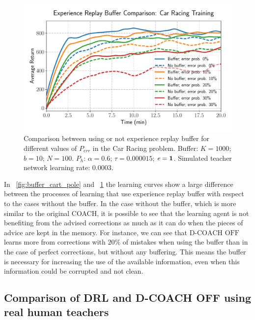 \begin{figure}[H]
    \centering
    \includegraphics[width=0.66\linewidth]{imagenes/cap3/bufferCarRacing.pdf}
    \caption[Comparison between using or not experience replay buffer for different values of $P_\mathit{err}$ in the Car Racing problem.]{Comparison between using or not experience replay buffer for different values of $P_\mathit{err}$ in the Car Racing problem. Buffer: $K = 1000$; $b = 10$; $N = 100$. $P_{h}$: $\alpha = 0.6$; $\tau = 0.000015$; $\emph{e}=\textbf{1}$. Simulated teacher network learning rate: $0.0003$.}
    \label{fig:buffer_car_racing}
\end{figure}

In \figurename~{\ref{fig:buffer_cart_pole}} and \figurename~{\ref{fig:buffer_car_racing}} the learning curves show a large difference between the processes of learning that use experience replay buffer with respect to the cases without the buffer. In the case without the buffer, which is more similar to the original COACH, it is possible to see that the learning agent is not benefiting from the advised corrections as much as it can do when the pieces of advice are kept in the memory. For instance, we can see that $\text{D-COACH OFF}$ learns more from corrections with $20 \%$ of mistakes when using the buffer than in the case of perfect corrections, but without any buffering. This means the buffer is necessary for increasing the use of the available information, even when this information could be corrupted and not clean.

\subsection{Comparison of DRL and D-COACH OFF using real human teachers}

